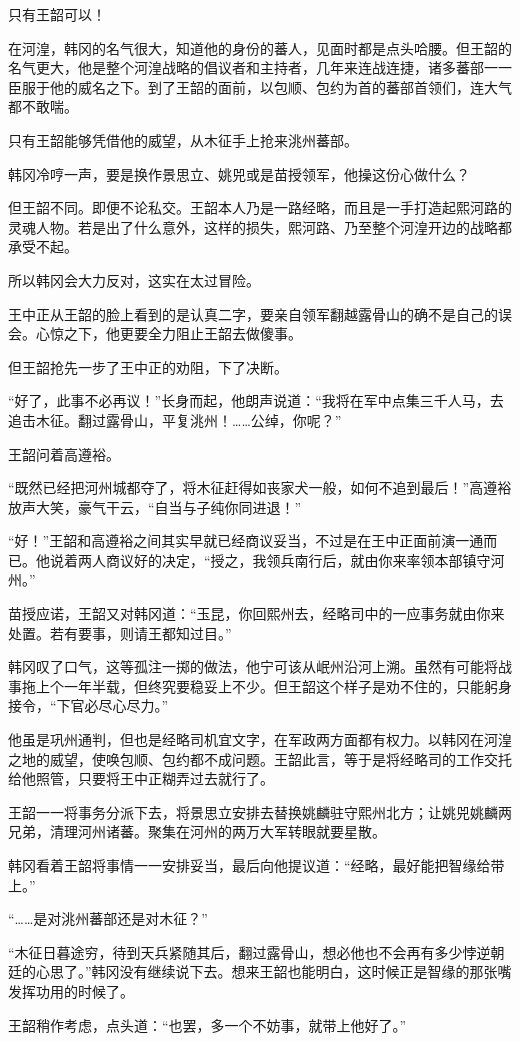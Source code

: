 只有王韶可以！

在河湟，韩冈的名气很大，知道他的身份的蕃人，见面时都是点头哈腰。但王韶的名气更大，他是整个河湟战略的倡议者和主持者，几年来连战连捷，诸多蕃部一一臣服于他的威名之下。到了王韶的面前，以包顺、包约为首的蕃部首领们，连大气都不敢喘。

只有王韶能够凭借他的威望，从木征手上抢来洮州蕃部。

韩冈冷哼一声，要是换作景思立、姚兕或是苗授领军，他操这份心做什么？

但王韶不同。即便不论私交。王韶本人乃是一路经略，而且是一手打造起熙河路的灵魂人物。若是出了什么意外，这样的损失，熙河路、乃至整个河湟开边的战略都承受不起。

所以韩冈会大力反对，这实在太过冒险。

王中正从王韶的脸上看到的是认真二字，要亲自领军翻越露骨山的确不是自己的误会。心惊之下，他更要全力阻止王韶去做傻事。

但王韶抢先一步了王中正的劝阻，下了决断。

“好了，此事不必再议！”长身而起，他朗声说道：“我将在军中点集三千人马，去追击木征。翻过露骨山，平复洮州！……公绰，你呢？”

王韶问着高遵裕。

“既然已经把河州城都夺了，将木征赶得如丧家犬一般，如何不追到最后！”高遵裕放声大笑，豪气干云，“自当与子纯你同进退！”

“好！”王韶和高遵裕之间其实早就已经商议妥当，不过是在王中正面前演一通而已。他说着两人商议好的决定，“授之，我领兵南行后，就由你来率领本部镇守河州。”

苗授应诺，王韶又对韩冈道：“玉昆，你回熙州去，经略司中的一应事务就由你来处置。若有要事，则请王都知过目。”

韩冈叹了口气，这等孤注一掷的做法，他宁可该从岷州沿河上溯。虽然有可能将战事拖上个一年半载，但终究要稳妥上不少。但王韶这个样子是劝不住的，只能躬身接令，“下官必尽心尽力。”

他虽是巩州通判，但也是经略司机宜文字，在军政两方面都有权力。以韩冈在河湟之地的威望，使唤包顺、包约都不成问题。王韶此言，等于是将经略司的工作交托给他照管，只要将王中正糊弄过去就行了。

王韶一一将事务分派下去，将景思立安排去替换姚麟驻守熙州北方；让姚兕姚麟两兄弟，清理河州诸蕃。聚集在河州的两万大军转眼就要星散。

韩冈看着王韶将事情一一安排妥当，最后向他提议道：“经略，最好能把智缘给带上。”

“……是对洮州蕃部还是对木征？”

“木征日暮途穷，待到天兵紧随其后，翻过露骨山，想必他也不会再有多少悖逆朝廷的心思了。”韩冈没有继续说下去。想来王韶也能明白，这时候正是智缘的那张嘴发挥功用的时候了。

王韶稍作考虑，点头道：“也罢，多一个不妨事，就带上他好了。”

